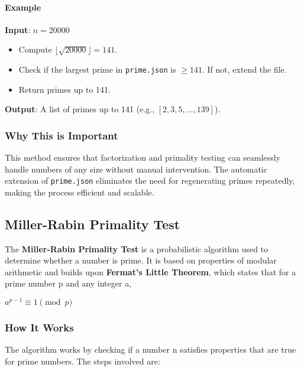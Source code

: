 \documentclass[12pt]{report}
\begin{document}
\paragraph{Example}
\textbf{Input}: $n = 20000$  
\begin{itemize}
    \item Compute $\lfloor \sqrt{20000} \rfloor = 141$.
    \item Check if the largest prime in \texttt{prime.json} is $\geq 141$. If not, extend the file.
    \item Return primes up to 141.
\end{itemize}  
\textbf{Output}: A list of primes up to 141 (e.g., $[2, 3, 5, \ldots, 139]$).

\subsubsection{Why This is Important}
This method ensures that factorization and primality testing can seamlessly handle numbers of any size without manual intervention. The automatic extension of \texttt{prime.json} eliminates the need for regenerating primes repeatedly, making the process efficient and scalable.

\subsection{Miller-Rabin Primality Test}

    The \textbf{Miller-Rabin Primality Test} is a probabilistic algorithm used to determine whether a number is prime. It is based on properties of modular arithmetic and builds upon \textbf{Fermat’s Little Theorem}, which states that for a prime number p and any integer a, 
    \begin{center}
    $a^{p-1} \equiv 1 \pmod{p}$
    \end{center}

\subsubsection{How It Works}
   The algorithm works by checking if a number n satisfies properties that are true for prime numbers. The steps involved are:
\end{document}
